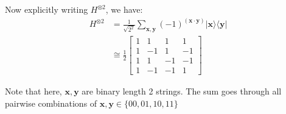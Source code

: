 Now explicitly writing $H^{\otimes 2}$, we have:
\begin{equation}
\begin{aligned}
H^{\otimes 2} & =\frac{1}{\sqrt{2^2}} \sum_{\mathbf{x}, \mathbf{y}}(-1)^{(\mathbf{x} \cdot \mathbf{y})}|\mathbf{x}\rangle\langle\mathbf{y}| \\
& \cong \frac{1}{2}\left[\begin{array}{cccc}
1 & 1 & 1 & 1 \\
1 & -1 & 1 & -1 \\
1 & 1 & -1 & -1 \\
1 & -1 & -1 & 1
\end{array}\right]
\end{aligned}
\end{equation}

Note that here, $\mathbf{x}, \mathbf{y}$ are binary length 2 strings. The sum goes through all pairwise combinations of $\mathbf{x}, \mathbf{y} \in\{00,01,10,11\}$